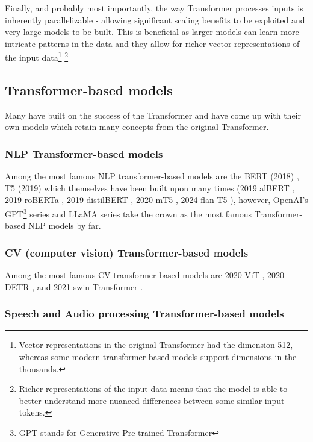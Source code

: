Finally, and probably most importantly, the way Transformer processes inputs is inherently parallelizable - allowing significant scaling benefits to be exploited and very large models to be built. This is beneficial as larger models can learn more intricate patterns in the data and they allow for richer vector representations of the input data\footnote{Vector representations in the original Transformer had the dimension 512, whereas some modern transformer-based models support dimensions in the thousands.} \footnote{Richer representations of the input data means that the model is able to better understand more nuanced differences between some similar input tokens.}

\subsection{Transformer-based models}

Many have built on the success of the Transformer and have come up with their own models which retain many concepts from the original Transformer.

\subsubsection{NLP Transformer-based models}

Among the most famous NLP transformer-based models are the BERT (2018) \cite{devlin2018bert}, T5 (2019) \cite{roberts2019exploring} which themselves have been built upon many times (2019 alBERT \cite{lan2019albert}, 2019 roBERTa \cite{liu2019roberta}, 2019 distilBERT \cite{sanh2019distilbert}, 2020 mT5 \cite{xue2020mt5}, 2024 flan-T5 \cite{chung2024scaling}), however, OpenAI's GPT\footnote{GPT stands for Generative Pre-trained Transformer} series and LLaMA series \cite{touvron2023llama} take the crown as the most famous Transformer-based NLP models by far.

\subsubsection{CV (computer vision) Transformer-based models}

Among the most famous CV transformer-based models are 2020 ViT \cite{dosovitskiy2020image}, 2020 DETR \cite{carion2020end}, and 2021 swin-Transformer \cite{liu2021swin}.

\subsubsection{Speech and Audio processing Transformer-based models}

